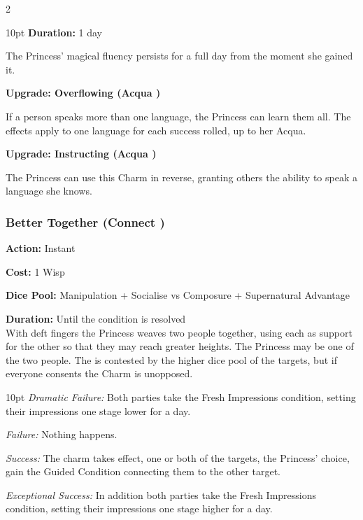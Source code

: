 \begin{multicols}{2}
\begin{myindentpar}{10pt}
\noindent \textbf{Duration:} 1 day

The Princess' magical fluency persists for a full day from the moment she gained it.

\textbf{Upgrade: Overflowing (Acqua \textbullet\textbullet)}

If a person speaks more than one language, the Princess can learn them all. The effects apply to one language for each success rolled, up to her Acqua.

\textbf{Upgrade: Instructing (Acqua \textbullet\textbullet)}

The Princess can use this Charm in reverse, granting others the ability to speak a language she knows. 

\end{myindentpar}

\subsubsection*{Better Together (Connect \textbullet\textbullet)}

\noindent \textbf{Action:} Instant

\noindent \textbf{Cost:} 1 Wisp

\noindent \textbf{Dice Pool:} Manipulation + Socialise vs Composure + Supernatural Advantage

\noindent \textbf{Duration:} Until the condition is resolved \\

\noindent With deft fingers the Princess weaves two people together, using each as support for the other so that they may reach greater heights. The Princess may be one of the two people. The is contested by the higher dice pool of the targets, but if everyone consents the Charm is unopposed. 

\begin{myindentpar}{10pt}
    \emph{Dramatic Failure:} Both parties take the Fresh Impressions condition, setting their impressions one stage lower for a day. 
    
    \emph{Failure:} Nothing happens. 
    
    \emph{Success:} The charm takes effect, one or both of the targets, the Princess' choice, gain the Guided Condition connecting them to the other target.
    
    \emph{Exceptional Success:} In addition both parties take the Fresh Impressions condition, setting their impressions one stage higher for a day. 
\end{myindentpar}


\end{multicols}
